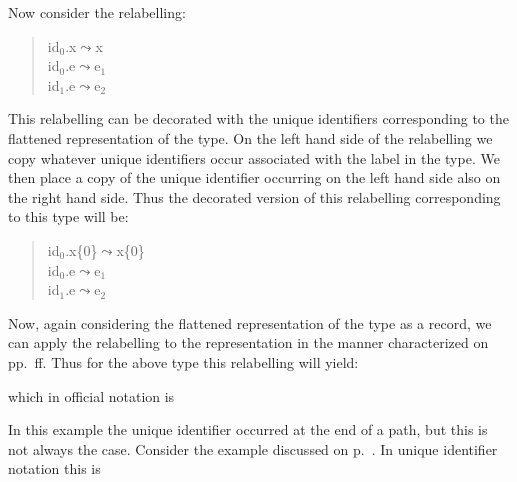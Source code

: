 Now consider the relabelling:
\begin{quote}
id$_0$.x$\leadsto$x\\
id$_0$.e$\leadsto$e$_1$\\
id$_1$.e$\leadsto$e$_2$
\end{quote}
This relabelling can be decorated with the unique identifiers
corresponding to the flattened representation of the type.  On the
left hand side of the relabelling we copy whatever unique identifiers
occur associated with the label in the type.  We then place a copy of
the unique identifier occurring on the left hand side also on the
right hand side.  Thus the decorated version of this relabelling
corresponding to this type will be:
\begin{quote}
id$_0$.x\{0\}$\leadsto$x\{0\}\\
id$_0$.e$\leadsto$e$_1$\\
id$_1$.e$\leadsto$e$_2$
\end{quote}
Now, again considering the flattened representation of the type as a
record, we can apply the relabelling to the representation in the
manner characterized on pp.~\pageref{pg:relabelling}ff.
Thus for the above type
this relabelling will yield:
\begin{quote}
\end{quote}
which in official notation is
\begin{quote}
\end{quote}
In this example the unique identifier occurred at the end of a path,
but this is not always the case.  Consider the example discussed on
p.~\pageref{pg:sam-saw-a-dog-run}.  In unique identifier notation this
is
\begin{quote}

\end{quote}
